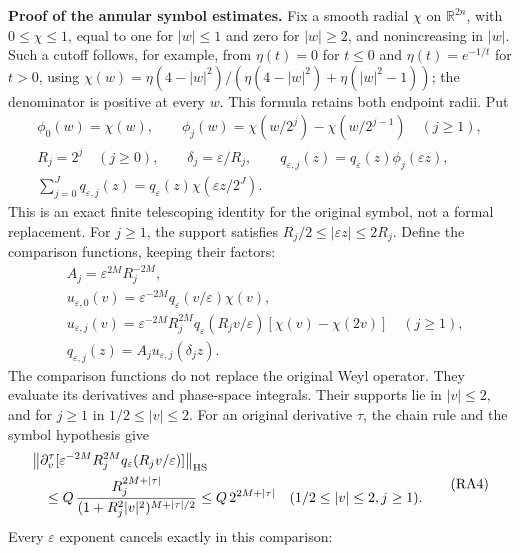 \documentclass[
  11pt,
]{article}
\begin{document}
\textbf{Proof of the annular symbol estimates.} Fix a smooth radial
\(\chi\) on \(\mathbb R^{2n}\), with \(0\leq\chi\leq1\), equal to one
for \(|w|\leq1\) and zero for \(|w|\geq2\), and nonincreasing in
\(|w|\). Such a cutoff follows, for example, from \(\eta(t)=0\) for
\(t\leq0\) and \(\eta(t)=e^{-1/t}\) for \(t>0\), using
\(\chi(w)=\eta(4-|w|^2)/(\eta(4-|w|^2)+\eta(|w|^2-1))\); the denominator
is positive at every \(w\). This formula retains both endpoint radii.
Put \[
 \begin{gathered}
 \phi_0(w)=\chi(w),\qquad
 \phi_j(w)=\chi(w/2^j)-\chi(w/2^{j-1})\quad(j\geq1),\\
 R_j=2^j\quad(j\geq0),\qquad
 \delta_j=\varepsilon/R_j,\qquad
 q_{\varepsilon,j}(z)=q_\varepsilon(z)\phi_j(\varepsilon z),\\
 \sum_{j=0}^Jq_{\varepsilon,j}(z)
       =q_\varepsilon(z)\chi(\varepsilon z/2^J).
 \end{gathered}
 \tag{RA2}
\] This is an exact finite telescoping identity for the original symbol,
not a formal replacement. For \(j\geq1\), the support satisfies
\(R_j/2\leq|\varepsilon z|\leq2R_j\). Define the comparison functions,
keeping their factors: \[
\begin{aligned}
 &A_j=\varepsilon^{2M}R_j^{-2M},\\
 &u_{\varepsilon,0}(v)
       =\varepsilon^{-2M}q_\varepsilon(v/\varepsilon)\chi(v),\\
 &u_{\varepsilon,j}(v)
       =\varepsilon^{-2M}R_j^{2M}
          q_\varepsilon(R_jv/\varepsilon)
                    [\chi(v)-\chi(2v)]\quad(j\geq1),\\
 &q_{\varepsilon,j}(z)=A_j u_{\varepsilon,j}(\delta_j z).
\end{aligned}
\tag{RA3}
\] The comparison functions do not replace the original Weyl operator.
They evaluate its derivatives and phase-space integrals. Their supports
lie in \(|v|\leq2\), and for \(j\geq1\) in \(1/2\leq|v|\leq2\). For an
original derivative \(\tau\), the chain rule and the symbol hypothesis
give \[
\begin{aligned}
 &\left\|\partial_v^\tau
       [\varepsilon^{-2M}R_j^{2M}
                     q_\varepsilon(R_jv/\varepsilon)]\right\|_{\mathrm{HS}}\\
 &\quad\leq Q\,
       {R_j^{2M+|\tau|}\over
                  (1+R_j^2|v|^2)^{M+|\tau|/2}}
 \leq Q\,2^{2M+|\tau|}
                   \quad(1/2\leq|v|\leq2, j\geq1).
\end{aligned}
\tag{RA4}
\] Every \(\varepsilon\) exponent cancels exactly in this comparison:
\end{document}
